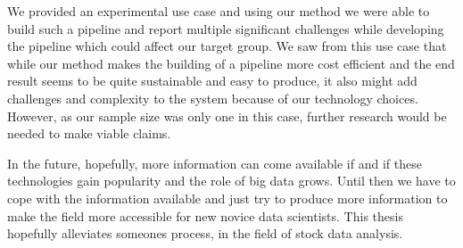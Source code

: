 We provided an experimental use case and using our method we were able to build such a pipeline and report multiple significant challenges while developing the pipeline which could affect our target group.
We saw from this use case that while our method makes the building of a pipeline more cost efficient and the end result seems to be quite sustainable and easy to produce, it also might add challenges and complexity to the system because of our technology choices.
However, as our sample size was only one in this case, further research would be needed to make viable claims.

In the future, hopefully, more information can come available if and if these technologies gain popularity and the role of big data grows.
Until then we have to cope with the information available and just try to produce more information to make the field more accessible for new novice data scientists.
This thesis hopefully alleviates someones process, in the field of stock data analysis.
